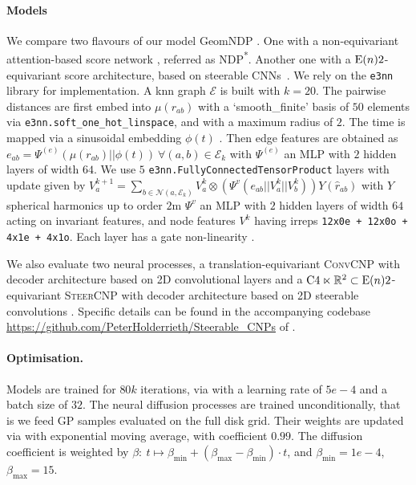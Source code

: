 \paragraph{Models}
We compare two flavours of our model GeomNDP \!
\!.
One with a non-equivariant attention-based score network \parencite[Figure C.1,][]{dutordoir2022Neural}, referred as {\scshape NDP\textsuperscript{*}}.
Another one with a $\mathrm{E}(n){2}$-equivariant score architecture, based on steerable CNNs~\parencite{thomas2018tensor,3DSteerable}.
We rely on the \texttt{e3nn} library \parencite{e3nn_paper} for implementation.
A knn graph $\mathcal{E}$ is built with $k=20$.
The pairwise distances are first embed into $\mu(r_{ab})$ with a `smooth\_finite' basis of $50$ elements via \texttt{e3nn.soft\_one\_hot\_linspace}, and with a maximum radius of $2$.
The time is mapped via a sinusoidal embedding $\phi(t)$ \parencite{vaswani2017attention}.
Then edge features are obtained as $e_{ab} = \Psi^{(e)}(\mu(r_{ab})||\phi(t)) \ \forall (a, b) \in \mathcal{E}_k$ with $\Psi^{(e)}$ an MLP with $2$ hidden layers of width $64$.
We use $5$ \texttt{e3nn.FullyConnectedTensorProduct} layers with update given by $V_a^{k+1} = \sum_{b \in \mathcal{N}(a, \mathcal{E}_k)} V_a^{k} \otimes \left(\Psi^{v}(e_{ab}||V_a^k||V_b^k)\right) Y(\hat{r}_{ab})$ with $Y$ spherical harmonics up to order $2$m $\Psi^{v}$ an MLP with $2$ hidden layers of width $64$ acting on invariant features, and node features $V^k$ having irreps \texttt{12x0e + 12x0o + 4x1e + 4x1o}.
Each layer has a gate non-linearity \parencite{3DSteerable}.

We also evaluate two neural processes, a translation-equivariant {\scshape ConvCNP} \parencite{gordon2019Convolutional} with decoder architecture based on 2D convolutional layers \parencite{lecungradient1998} and a $\mathrm{C}4 \ltimes \mathbb{R}^2 \subset \mathrm{E}(n){2}$-equivariant {\scshape SteerCNP} \parencite{holderrieth2021equivariant} with decoder architecture based on 2D steerable convolutions \parencite{weiler2023equivariant}.
Specific details can be found in the accompanying codebase \url{https://github.com/PeterHolderrieth/Steerable_CNPs} of \textcite{holderrieth2021equivariant}.

\paragraph{Optimisation.}
Models are trained for $80k$ iterations, via \parencite{kingma2014adam} with a learning rate of $5e-4$ and a batch size of $32$.
The neural diffusion processes are trained unconditionally, that is we feed GP samples evaluated on the full disk grid.
Their weights are updated via with exponential moving average, with coefficient $0.99$.
The diffusion coefficient is weighted by $\beta: \ t \mapsto \beta_{\min} + (\beta_{\max} - \beta_{\min}) \cdot t$, and $\beta_{\min}= 1e-4$, $\beta_{\max} = 15$.

